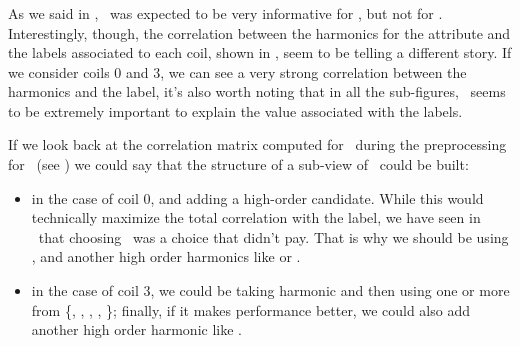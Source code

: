 \subsubsection{\cnmod}
As we said in , \cnmod\ was expected to be very informative for \qrp, but not for
\qlp. Interestingly, though, the correlation between the harmonics for the attribute and the labels
associated to each coil, shown in , seem to be telling a different story.
If we consider coils $0$ and $3$, we can see a very strong correlation between the harmonics and the
label, it's also worth noting that in all the sub-figures, \cnmod[2]\ seems to be extremely
important to explain the value associated with the labels.

If we look back at the correlation matrix computed for \cnmod\ during the preprocessing for \qrp\
(see ) we could say that the structure of a sub-view of \cnmod\ could be built:
\begin{itemize}
	\item in the case of coil $0$, \cnmod[2] and adding a high-order candidate.
	      While this would technically maximize the total correlation with the label, we have
	      seen in \qrp\ that choosing \cnmod[2]\ was a choice that didn't pay. That
	      is why we should be using \cnmod[3], \cnmod[6] and another high order harmonics like \cnmod[9] or \cnmod[11].
	\item in the case of coil $3$, we could be taking harmonic \cnmod[1] and then using one or
	      more from \{\cnmod[4], \cnmod[5], \cnmod[6], \cnmod[7], \cnmod[8]\}; finally, if it makes performance better, we could also add
	      another high order harmonic like \cnmod[10].
\end{itemize}
